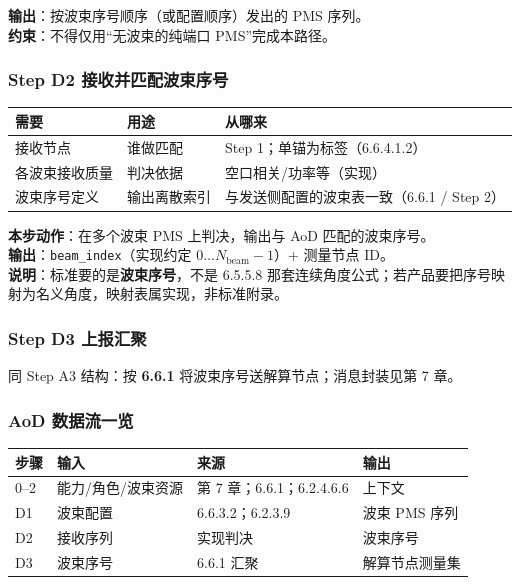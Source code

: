 \documentclass[11pt,a4paper]{ctexart}
\begin{document}
\textbf{输出}：按波束序号顺序（或配置顺序）发出的 PMS 序列。\\
\textbf{约束}：不得仅用``无波束的纯端口 PMS''完成本路径。

\subsubsection{Step D2 接收并匹配波束序号}

\begin{table}[h]
\centering
\small
\begin{tabular}{L{3.2cm}L{5.0cm}L{4.8cm}}
\toprule
\textbf{需要} & \textbf{用途} & \textbf{从哪来} \\
\midrule
接收节点 & 谁做匹配 & Step 1；单锚为标签（6.6.4.1.2） \\
各波束接收质量 & 判决依据 & 空口相关/功率等（实现） \\
波束序号定义 & 输出离散索引 & 与发送侧配置的波束表一致（6.6.1 / Step 2） \\
\bottomrule
\end{tabular}
\end{table}

\textbf{本步动作}：在多个波束 PMS 上判决，输出与 AoD 匹配的波束序号。\\
\textbf{输出}：\texttt{beam\_index}（实现约定 $0\ldots N_{\mathrm{beam}}-1$）+ 测量节点 ID。\\
\textbf{说明}：标准要的是\textbf{波束序号}，不是 6.5.5.8 那套连续角度公式；若产品要把序号映射为名义角度，映射表属实现，非标准附录。

\subsubsection{Step D3 上报汇聚}

同 Step A3 结构：按 \textbf{6.6.1} 将波束序号送解算节点；消息封装见第 7 章。

\subsubsection{AoD 数据流一览}

\begin{table}[h]
\centering
\small
\begin{tabular}{llll}
\toprule
\textbf{步骤} & \textbf{输入} & \textbf{来源} & \textbf{输出} \\
\midrule
0--2 & 能力/角色/波束资源 & 第 7 章；6.6.1；6.2.4.6.6 & 上下文 \\
D1 & 波束配置 & 6.6.3.2；6.2.3.9 & 波束 PMS 序列 \\
D2 & 接收序列 & 实现判决 & 波束序号 \\
D3 & 波束序号 & 6.6.1 汇聚 & 解算节点测量集 \\
\bottomrule
\end{tabular}
\end{table}
\end{document}
